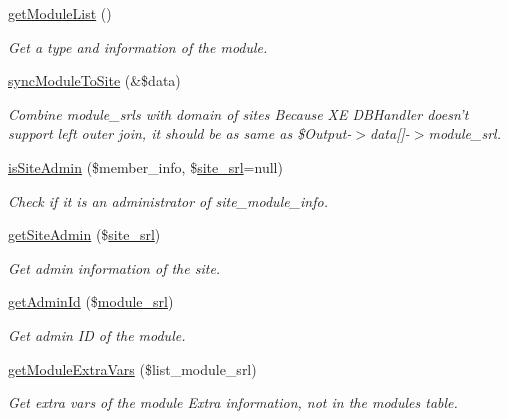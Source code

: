 \begin{DoxyCompactItemize}
\item 
\hyperlink{classmoduleModel_af51708f2ce0243f482bc92a453dd27c4}{get\+Module\+List} ()
\begin{DoxyCompactList}\small\item\em Get a type and information of the module. \end{DoxyCompactList}\item 
\hyperlink{classmoduleModel_ab51d556817682d653b92e09a34b138d6}{sync\+Module\+To\+Site} (\&\$data)
\begin{DoxyCompactList}\small\item\em Combine module\+\_\+srls with domain of sites Because X\+E D\+B\+Handler doesn't support left outer join, it should be as same as \$\+Output-\/$>$data\mbox{[}\mbox{]}-\/$>$module\+\_\+srl. \end{DoxyCompactList}\item 
\hyperlink{classmoduleModel_aae55c42d2818ffd09f81d6cb215c59ff}{is\+Site\+Admin} (\$member\+\_\+info, \$\hyperlink{ko_8install_8php_a8b1406b4ad1048041558dce6bfe89004}{site\+\_\+srl}=null)
\begin{DoxyCompactList}\small\item\em Check if it is an administrator of site\+\_\+module\+\_\+info. \end{DoxyCompactList}\item 
\hyperlink{classmoduleModel_a6baa2faf83fc96fba51072276c9cb7c3}{get\+Site\+Admin} (\$\hyperlink{ko_8install_8php_a8b1406b4ad1048041558dce6bfe89004}{site\+\_\+srl})
\begin{DoxyCompactList}\small\item\em Get admin information of the site. \end{DoxyCompactList}\item 
\hyperlink{classmoduleModel_a302d180d2acef6331f9123d60f76c8c1}{get\+Admin\+Id} (\$\hyperlink{ko_8install_8php_a370bb6450fab1da3e0ed9f484a38b761}{module\+\_\+srl})
\begin{DoxyCompactList}\small\item\em Get admin I\+D of the module. \end{DoxyCompactList}\item 
\hyperlink{classmoduleModel_a4e93226573048a7b9c8e2cb842d0cb30}{get\+Module\+Extra\+Vars} (\$list\+\_\+module\+\_\+srl)
\begin{DoxyCompactList}\small\item\em Get extra vars of the module Extra information, not in the modules table. \end{DoxyCompactList}\item 

\end{DoxyCompactItemize}
